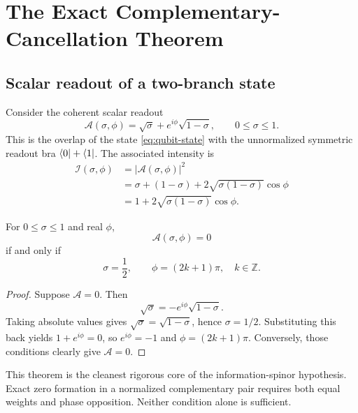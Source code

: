 \chapter{The Exact Complementary-Cancellation Theorem}
\label{ch:cancellation}

\section{Scalar readout of a two-branch state}
Consider the coherent scalar readout
\begin{equation}
\mathcal A(\sigma,\phi)
=\sqrt{\sigma}+e^{i\phi}\sqrt{1-\sigma},
\qquad 0\leq\sigma\leq1.
\label{eq:amp}
\end{equation}
This is the overlap of the state \eqref{eq:qubit-state} with the unnormalized symmetric readout bra $\langle 0\rvert+\langle 1\rvert$. The associated intensity is
\begin{align}
\mathcal I(\sigma,\phi)
&=|\mathcal A(\sigma,\phi)|^2\\
&=\sigma+(1-\sigma)+2\sqrt{\sigma(1-\sigma)}\cos\phi\\
&=1+2\sqrt{\sigma(1-\sigma)}\cos\phi.
\label{eq:intensity}
\end{align}

\begin{theorem}
\label{thm:cancellation}
For $0\leq\sigma\leq1$ and real $\phi$,
\begin{equation}
\mathcal A(\sigma,\phi)=0
\end{equation}
if and only if
\begin{equation}
\sigma=\frac12,
\qquad
\phi=(2k+1)\pi,
\quad k\in\mathbb Z.
\end{equation}
\end{theorem}

\begin{proof}
Suppose $\mathcal A=0$. Then
\begin{equation}
\sqrt{\sigma}=-e^{i\phi}\sqrt{1-\sigma}.
\end{equation}
Taking absolute values gives $\sqrt{\sigma}=\sqrt{1-\sigma}$, hence $\sigma=1/2$. Substituting this back yields $1+e^{i\phi}=0$, so $e^{i\phi}=-1$ and $\phi=(2k+1)\pi$. Conversely, those conditions clearly give $\mathcal A=0$.
\end{proof}

This theorem is the cleanest rigorous core of the information-spinor hypothesis. Exact zero formation in a normalized complementary pair requires both equal weights and phase opposition. Neither condition alone is sufficient.

